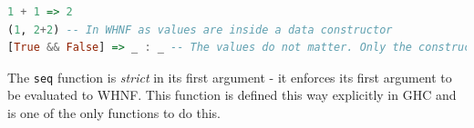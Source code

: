\begin{lstlisting}[language=haskell]
1 + 1 => 2
(1, 2+2) -- In WHNF as values are inside a data constructor
[True && False] => _ : _ -- The values do not matter. Only the constructor '(:)' matters in WHNF.
\end{lstlisting}

The \texttt{seq} function is \textit{strict} in its first argument - it enforces its first argument to be evaluated to WHNF. This function is defined this way explicitly in GHC and is one of the only functions to do this.